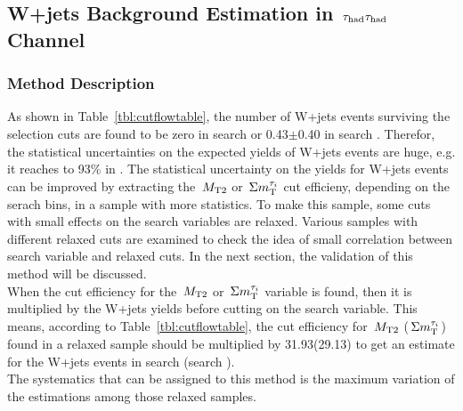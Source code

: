 \subsection{\texorpdfstring{W+jets Background Estimation in $\,\tau_{\rm had}\tau_{\rm had}$ Channel}{W+jets Background Estimation in tau-tau Channel}}
\subsubsection{Method Description}
As shown in Table~\ref{tbl:cutflowtable}, the number of W+jets events surviving 
the selection cuts are found to be zero in search \binone or 0.43$\pm$0.40 in search \bintwo. 
Therefor, the statistical uncertainties on the expected yields of W+jets events
are huge, e.g. it reaches to 93\% in \bintwo. 
 The statistical uncertainty on the yields for W+jets events can be improved by extracting 
the $\,{M_{\rm T2}}$ or $\,\Sigma m_{\rm T}^{\tau_i}$ cut efficieny, depending on the serach bins, in a sample with more 
statistics. To make this sample, some cuts with small effects on the search variables are 
relaxed. Various samples with different relaxed cuts are examined to check the idea of small correlation 
between search variable and relaxed cuts. In the next section, the validation of this method will be discussed.\\
When the cut efficiency for the $\,{M_{\rm T2}}$ or $\,\Sigma m_{\rm T}^{\tau_i}$ variable is found, then it is multiplied by the W+jets 
yields before cutting on the search variable. This means, according to Table~\ref{tbl:cutflowtable}, the cut efficiency for 
$\,{M_{\rm T2}}$ ($\,\Sigma m_{\rm T}^{\tau_i}$) found in a relaxed sample should be multiplied by 31.93(29.13) to get an 
estimate for the W+jets events in search \binone (search \bintwo).\\
The systematics that can be assigned to this method is the maximum
variation of the estimations among those relaxed samples.
